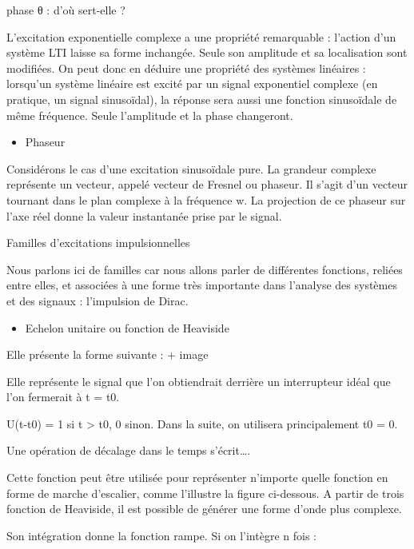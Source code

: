 \documentclass[]{article}
\begin{document}
phase θ : d'où sert-elle ?

L'excitation exponentielle complexe a une propriété remarquable :
l'action d'un système LTI laisse sa forme inchangée. Seule son amplitude
et sa localisation sont modifiées. On peut donc en déduire une propriété
des systèmes linéaires : lorsqu'un système linéaire est excité par un
signal exponentiel complexe (en pratique, un signal sinusoïdal), la
réponse sera aussi une fonction sinusoïdale de même fréquence. Seule
l'amplitude et la phase changeront.

\begin{itemize}
\itemsep1pt\parskip0pt
\item
  Phaseur
\end{itemize}

Considérons le cas d'une excitation sinusoïdale pure. La grandeur
complexe représente un vecteur, appelé vecteur de Fresnel ou phaseur. Il
s'agit d'un vecteur tournant dans le plan complexe à la fréquence w. La
projection de ce phaseur sur l'axe réel donne la valeur instantanée
prise par le signal.

Familles d'excitations impulsionnelles

Nous parlons ici de familles car nous allons parler de différentes
fonctions, reliées entre elles, et associées à une forme très importante
dans l'analyse des systèmes et des signaux : l'impulsion de Dirac.

\begin{itemize}
\itemsep1pt\parskip0pt
\item
  Echelon unitaire ou fonction de Heaviside
\end{itemize}

Elle présente la forme suivante : + image

Elle représente le signal que l'on obtiendrait derrière un interrupteur
idéal que l'on fermerait à t = t0.

U(t-t0) = 1 si t \textgreater{} t0, 0 sinon. Dans la suite, on utilisera
principalement t0 = 0.~

Une opération de décalage dans le temps s'écrit\ldots{}.~

Cette fonction peut être utilisée pour représenter n'importe quelle
fonction en forme de marche d'escalier, comme l'illustre la figure
ci-dessous. A partir de trois fonction de Heaviside, il est possible de
générer une forme d'onde plus complexe.

Son intégration donne la fonction rampe. Si on l'intègre n fois :
\end{document}
